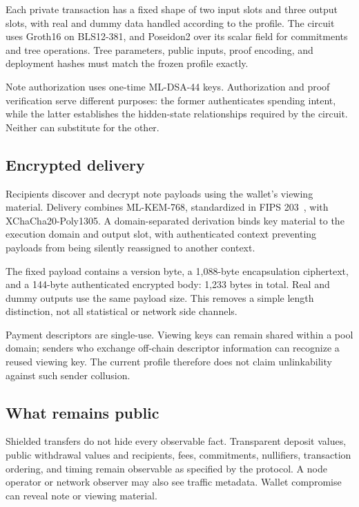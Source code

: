 \documentclass[11pt,a4paper]{article}
\begin{document}
\begin{center}
\end{center}
Each private transaction has a fixed shape of two input slots and three
output slots, with real and dummy data handled according to the profile.
The circuit uses Groth16 on BLS12-381, and Poseidon2 over its scalar field
for commitments and tree operations. Tree parameters, public inputs, proof
encoding, and deployment hashes must match the frozen profile exactly.

Note authorization uses one-time ML-DSA-44 keys. Authorization and proof
verification serve different purposes: the former authenticates spending
intent, while the latter establishes the hidden-state relationships required
by the circuit. Neither can substitute for the other.

\subsection{Encrypted delivery}
Recipients discover and decrypt note payloads using the wallet's viewing
material. Delivery combines ML-KEM-768, standardized in FIPS 203~\cite{fips203},
with XChaCha20-Poly1305. A domain-separated derivation binds key material to
the execution domain and output slot, with authenticated context preventing
payloads from being silently reassigned to another context.

The fixed payload contains a version byte, a 1,088-byte encapsulation
ciphertext, and a 144-byte authenticated encrypted body: 1,233 bytes in total.
Real and dummy outputs use the same payload size. This removes a simple
length distinction, not all statistical or network side channels.

Payment descriptors are single-use. Viewing keys can remain shared within a
pool domain; senders who exchange off-chain descriptor information can
recognize a reused viewing key. The current profile therefore does not claim
unlinkability against such sender collusion.

\subsection{What remains public}
Shielded transfers do not hide every observable fact. Transparent deposit
values, public withdrawal values and recipients, fees, commitments,
nullifiers, transaction ordering, and timing remain observable as specified
by the protocol. A node operator or network observer may also see traffic
metadata. Wallet compromise can reveal note or viewing material.
\end{document}
